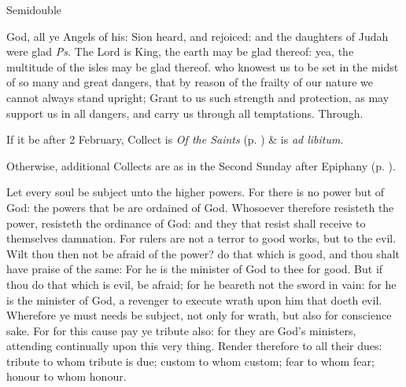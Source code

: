 \begin{inhead}
{Semidouble}
\end{inhead}
\par\noindent
{}


\introit
{} God, all ye Angels of his: Sion heard, and rejoiced: and the daughters of Judah were glad \textit{Ps.} The Lord is King, the earth may be glad thereof: yea, the multitude of the isles may be glad thereof.
\collect
{} who knowest us to be set in the midst of so many and great dangers, that by reason of the frailty of our nature we cannot always stand upright; Grant to us such strength and protection, as may support us in all dangers, and carry us through all temptations. Through.
\begin{rubric}
    If it be after 2 February,  Collect is \emph{Of the Saints} (p. \pageref{SPSaints}) \&  is \emph{ad libitum}.\par
    Otherwise, additional Collects are as in the Second Sunday after Epiphany (p. \pageref{EpiphanyII}).
\end{rubric}
 Let every soul be subject unto the higher powers. For there is no power but of God: the powers that be are ordained of God. Whosoever therefore resisteth the power, resisteth the ordinance of God: and they that resist shall receive to themselves damnation. For rulers are not a terror to good works, but to the evil. Wilt thou then not be afraid of the power? do that which is good, and thou shalt have praise of the same: For he is the minister of God to thee for good. But if thou do that which is evil, be afraid; for he beareth not the sword in vain: for he is the minister of God, a revenger to execute wrath upon him that doeth evil. Wherefore ye must needs be subject, not only for wrath, but also for conscience sake. For for this cause pay ye tribute also: for they are God's ministers, attending continually upon this very thing. Render therefore to all their dues: tribute to whom tribute is due; custom to whom custom; fear to whom fear; honour to whom honour.

